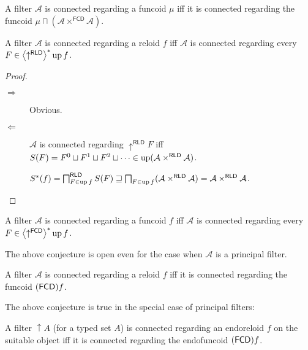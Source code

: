 \begin{obvious}
A filter $\mathcal{A}$ is connected regarding a funcoid $\mu$ iff
it is connected regarding the funcoid $\mu\sqcap(\mathcal{A}\times^{\mathsf{FCD}}\mathcal{A})$.\end{obvious}
\begin{thm}
A filter $\mathcal{A}$ is connected regarding a reloid $f$ iff $\mathcal{A}$
is connected regarding every $F\in\left\langle \uparrow^{\mathsf{RLD}}\right\rangle ^{\ast}\operatorname{up} f$.\end{thm}
\begin{proof}
~
\begin{description}
\item [{$\Rightarrow$}] Obvious.
\item [{$\Leftarrow$}] $\mathcal{A}$ is connected regarding $\uparrow^{\mathsf{RLD}}F$
iff $S(F)=F^{0}\sqcup F^{1}\sqcup F^{2}\sqcup\dots\in\operatorname{up}(\mathcal{A}\times^{\mathsf{RLD}}\mathcal{A})$.


$S^{\ast}(f)=\bigsqcap_{F\in\operatorname{up} f}^{\mathsf{RLD}}S(F)\sqsupseteq\bigsqcap_{F\in\operatorname{up} f}(\mathcal{A}\times^{\mathsf{RLD}}\mathcal{A})=\mathcal{A}\times^{\mathsf{RLD}}\mathcal{A}$.

\end{description}
\end{proof}
\begin{conjecture}
A filter $\mathcal{A}$ is connected regarding a funcoid $f$ iff
$\mathcal{A}$ is connected regarding every $F\in\left\langle \uparrow^{\mathsf{FCD}}\right\rangle ^{\ast}\operatorname{up} f$.
\end{conjecture}
The above conjecture is open even for the case when $\mathcal{A}$
is a principal filter.
\begin{conjecture}
A filter $\mathcal{A}$ is connected regarding a reloid $f$ iff it
is connected regarding the funcoid $(\mathsf{FCD}) f$.
\end{conjecture}
The above conjecture is true in the special case of principal filters:
\begin{prop}
A filter $\uparrow A$ (for a typed set $A$) is connected regarding
an endoreloid $f$ on the suitable object iff it is connected regarding the endofuncoid $(\mathsf{FCD}) f$.\end{prop}
